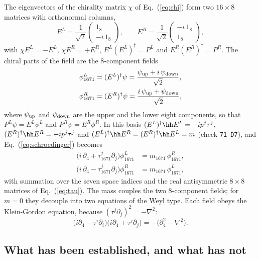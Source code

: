 The eigenvectors of the chirality matrix $\chi$ of Eq.~(\ref{eq:chi}) form two $16\times8$ matrices
with orthonormal columns,
\begin{equation}
E^{L}=\frac1{\sqrt2}\begin{pmatrix}1_8\\-i\,1_8\end{pmatrix},\qquad
E^{R}=\frac1{\sqrt2}\begin{pmatrix}-i\,1_8\\1_8\end{pmatrix},
\label{eq:frames}
\end{equation}
with $\chi E^{L}=-E^{L}$, $\chi E^{R}=+E^{R}$, $E^{L}(E^{L})^\dagger=P^{L}$ and
$E^{R}(E^{R})^\dagger=P^{R}$. The chiral parts of the field are the 8-component fields
\begin{align}
\phi_{1671}^{L}&=(E^{L})^\dagger\psi=\frac{\psi_{\rm up}+i\,\psi_{\rm down}}{\sqrt2},\nonumber\\
\phi_{1671}^{R}&=(E^{R})^\dagger\psi=\frac{i\,\psi_{\rm up}+\psi_{\rm down}}{\sqrt2},
\label{eq:phiLR}
\end{align}
where $\psi_{\rm up}$ and $\psi_{\rm down}$ are the upper and the lower eight components, so that
$P^{L}\psi=E^{L}\phi^{L}$ and $P^{R}\psi=E^{R}\phi^{R}$. In this basis
$(E^{L})^\dagger\hh E^{L}=-ip^j\tau^j$, $(E^{R})^\dagger\hh E^{R}=+ip^j\tau^j$ and
$(E^{L})^\dagger\hh E^{R}=(E^{R})^\dagger\hh E^{L}=m$ (check \texttt{71-D7}), and
Eq.~(\ref{eq:schroedinger}) becomes
\begin{align}
\big(i\,\partial_4+\tau_{1671}^j\partial_j\big)\phi_{1671}^{L}&=m_{1671}\,\phi_{1671}^{R},\nonumber\\
\big(i\,\partial_4-\tau_{1671}^j\partial_j\big)\phi_{1671}^{R}&=m_{1671}\,\phi_{1671}^{L},
\label{eq:chiral}
\end{align}
with summation over the seven space indices and the real antisymmetric $8\times8$ matrices of
Eq.~(\ref{eq:tau}). The mass couples the two 8-component fields; for $m=0$ they decouple into two
equations of the Weyl type. Each field obeys the Klein-Gordon equation, because
$(\tau^j\partial_j)^2=-\nabla^2$:
\begin{equation}
\big(i\partial_4-\tau^i\partial_i\big)\big(i\partial_4+\tau^j\partial_j\big)=-\big(\partial_4^2-\nabla^2\big).
\end{equation}

\subsection{What has been established, and what has not}

